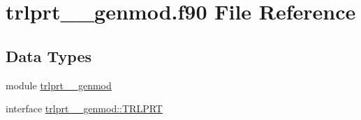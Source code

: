 \hypertarget{trlprt____genmod_8f90}{\section{trlprt\+\_\+\+\_\+genmod.\+f90 File Reference}
\label{trlprt____genmod_8f90}
}
\subsection*{Data Types}
\begin{DoxyCompactItemize}
\item 
module \hyperlink{classtrlprt____genmod}{trlprt\+\_\+\+\_\+genmod}
\item 
interface \hyperlink{interfacetrlprt____genmod_1_1TRLPRT}{trlprt\+\_\+\+\_\+genmod\+::\+T\+R\+L\+P\+R\+T}
\end{DoxyCompactItemize}
